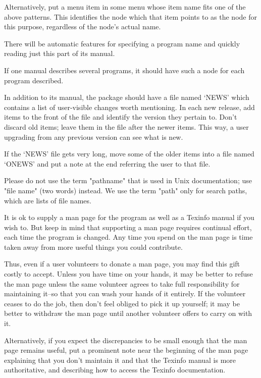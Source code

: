    Alternatively, put a menu item in some menu whose item name fits one
of the above patterns.  This identifies the node which that item points
to as the node for this purpose, regardless of the node's actual name.

   There will be automatic features for specifying a program name and
quickly reading just this part of its manual.

   If one manual describes several programs, it should have such a node
for each program described.

   In addition to its manual, the package should have a file named
`NEWS' which contains a list of user-visible changes worth mentioning.
In each new release, add items to the front of the file and identify
the version they pertain to.  Don't discard old items; leave them in
the file after the newer items.  This way, a user upgrading from any
previous version can see what is new.

   If the `NEWS' file gets very long, move some of the older items into
a file named `ONEWS' and put a note at the end referring the user to
that file.

   Please do not use the term "pathname" that is used in Unix
documentation; use "file name" (two words) instead.  We use the term
"path" only for search paths, which are lists of file names.

   It is ok to supply a man page for the program as well as a Texinfo
manual if you wish to.  But keep in mind that supporting a man page
requires continual effort, each time the program is changed.  Any time
you spend on the man page is time taken away from more useful things you
could contribute.

   Thus, even if a user volunteers to donate a man page, you may find
this gift costly to accept.  Unless you have time on your hands, it may
be better to refuse the man page unless the same volunteer agrees to
take full responsibility for maintaining it--so that you can wash your
hands of it entirely.  If the volunteer ceases to do the job, then
don't feel obliged to pick it up yourself; it may be better to withdraw
the man page until another volunteer offers to carry on with it.

   Alternatively, if you expect the discrepancies to be small enough
that the man page remains useful, put a prominent note near the
beginning of the man page explaining that you don't maintain it and
that the Texinfo manual is more authoritative, and describing how to
access the Texinfo documentation.

